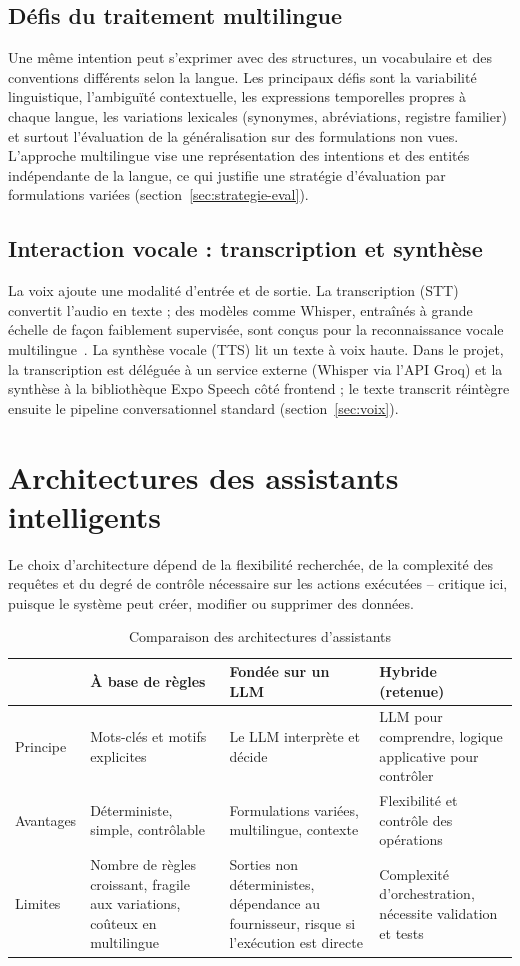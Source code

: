\documentclass[11pt,a4paper,openany,oneside]{report}
\begin{document}
\subsection{Défis du traitement multilingue}
Une même intention peut s'exprimer avec des structures, un vocabulaire et des conventions différents selon la langue. Les principaux défis sont la variabilité linguistique, l'ambiguïté contextuelle, les expressions temporelles propres à chaque langue, les variations lexicales (synonymes, abréviations, registre familier) et surtout l'évaluation de la généralisation sur des formulations non vues. L'approche multilingue vise une représentation des intentions et des entités indépendante de la langue, ce qui justifie une stratégie d'évaluation par formulations variées (section~\ref{sec:strategie-eval}).

\subsection{Interaction vocale : transcription et synthèse}
La voix ajoute une modalité d'entrée et de sortie. La transcription (STT) convertit l'audio en texte ; des modèles comme Whisper, entraînés à grande échelle de façon faiblement supervisée, sont conçus pour la reconnaissance vocale multilingue~\cite{radford2023}. La synthèse vocale (TTS) lit un texte à voix haute. Dans le projet, la transcription est déléguée à un service externe (Whisper via l'API Groq) et la synthèse à la bibliothèque Expo Speech côté frontend ; le texte transcrit réintègre ensuite le pipeline conversationnel standard (section~\ref{sec:voix}).

\section{Architectures des assistants intelligents}
Le choix d'architecture dépend de la flexibilité recherchée, de la complexité des requêtes et du degré de contrôle nécessaire sur les actions exécutées -- critique ici, puisque le système peut créer, modifier ou supprimer des données.

\begin{table}[htbp]
\centering\small
\caption{Comparaison des architectures d'assistants}\label{tab:archi-comp}
\begin{tabularx}{\textwidth}{@{}lXXX@{}}
\toprule
 & \textbf{À base de règles} & \textbf{Fondée sur un LLM} & \textbf{Hybride (retenue)} \\
\midrule
Principe & Mots-clés et motifs explicites & Le LLM interprète et décide & LLM pour comprendre, logique applicative pour contrôler \\
Avantages & Déterministe, simple, contrôlable & Formulations variées, multilingue, contexte & Flexibilité et contrôle des opérations \\
Limites & Nombre de règles croissant, fragile aux variations, coûteux en multilingue & Sorties non déterministes, dépendance au fournisseur, risque si l'exécution est directe & Complexité d'orchestration, nécessite validation et tests \\
\bottomrule
\end{tabularx}
\end{table}
\end{document}
